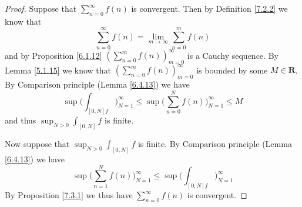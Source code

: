 \begin{proof}
    Suppose that \(\sum_{n = 0}^\infty f(n)\) is convergent.
    Then by Definition \ref{7.2.2} we know that
    \[
        \sum_{n = 0}^\infty f(n) = \lim_{m \to \infty} \sum_{n = 0}^m f(n)
    \]
    and by Proposition \ref{6.1.12} \((\sum_{n = 0}^m f(n))_{m = 0}^\infty\) is a Cauchy sequence.
    By Lemma \ref{5.1.15} we know that \((\sum_{n = 0}^m f(n))_{m = 0}^\infty\) is bounded by some \(M \in \mathbf{R}\).
    By Comparison principle (Lemma \ref{6.4.13}) we have
    \[
        \sup \bigg(\int_{[0, N] f}\bigg)_{N = 1}^\infty \leq \sup \bigg(\sum_{n = 0}^N f(n)\bigg)_{N = 1}^\infty \leq M
    \]
    and thus \(\sup_{N > 0} \int_{[0, N]} f\) is finite.

    Now suppose that \(\sup_{N > 0} \int_{[0, N]} f\) is finite.
    By Comparison principle (Lemma \ref{6.4.13}) we have
    \[
        \sup \bigg(\sum_{n = 1}^N f(n)\bigg)_{N = 1}^\infty \leq \sup \bigg(\int_{[0, N] f}\bigg)_{N = 1}^\infty
    \]
    By Proposition \ref{7.3.1} we thus have \(\sum_{n = 0}^\infty f(n)\) is convergent.
\end{proof}